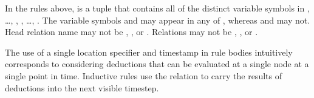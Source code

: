 In the rules above,  is a tuple that contains all of the distinct variable
symbols in , \ldots, , , \ldots,
.  The variable symbols  and  may appear in
any of , whereas  and  may not.
Head relation name  may not be , , or . Relations
 may not be
, , or \dedalus{<}. %

The use of a single location specifier and timestamp in rule bodies intuitively corresponds to considering deductions that can be evaluated at a single node at a single point in time.  Inductive rules use the  relation to carry the results of deductions into the next visible timestep.

\begin{comment}
\subsection{Causality rewrite}

As written, asynchronous rules can allow messages to travel back in time.  Intuitively, we strive to allow only those models that are causally plausible: a message sent by a node at local timestamp $s$ cannot cause a message to arrive in the past of node $x$ (i.e., before local timestamp $s$).

\begin{Drules}
\drule{notZero(T)}
      {timeSucc(T,S)}
\drule{zero(T)}
      {time(T), \lnot notZero(T)}
\end{Drules}

\begin{Drules}
\drule{rcvClock(X,S,Y,S)}
      {node(X), node(Y), X \neq Y, zero(S)}
\drule{rcvClock(X,S,X,S')}
      {node(X), timeSucc(S,S')}
\drule{rcvClock(X,S',Y,T)}
      {clock(X,S,Y,T), X \neq Y, timeSucc(S,S')}
\end{Drules}

\footnote{We can get \neq from < by disjunction.}

Given the following asynchronous rule, without any causality enforced:

...

We rewrite it as the following batch of rules:

...
\end{comment}

